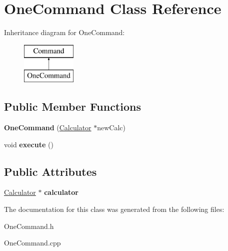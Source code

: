 \hypertarget{class_one_command}{}\section{One\+Command Class Reference}
\label{class_one_command}
Inheritance diagram for One\+Command\+:\begin{figure}[H]
\begin{center}
\leavevmode
\includegraphics[height=2.000000cm]{class_one_command}
\end{center}
\end{figure}
\subsection*{Public Member Functions}
\begin{DoxyCompactItemize}
\item 
\hypertarget{class_one_command_a20db00d94b5c1d86603be7d91fcd0303}{}{\bfseries One\+Command} (\hyperlink{class_calculator}{Calculator} $\ast$new\+Calc)\label{class_one_command_a20db00d94b5c1d86603be7d91fcd0303}

\item 
\hypertarget{class_one_command_a5a044d694cd01f447d1f57ac25dccd01}{}void {\bfseries execute} ()\label{class_one_command_a5a044d694cd01f447d1f57ac25dccd01}

\end{DoxyCompactItemize}
\subsection*{Public Attributes}
\begin{DoxyCompactItemize}
\item 
\hypertarget{class_one_command_a8867d5fb2fd62bfcd2a7d9f69bf08d93}{}\hyperlink{class_calculator}{Calculator} $\ast$ {\bfseries calculator}\label{class_one_command_a8867d5fb2fd62bfcd2a7d9f69bf08d93}

\end{DoxyCompactItemize}


The documentation for this class was generated from the following files\+:\begin{DoxyCompactItemize}
\item 
One\+Command.\+h\item 
One\+Command.\+cpp\end{DoxyCompactItemize}
